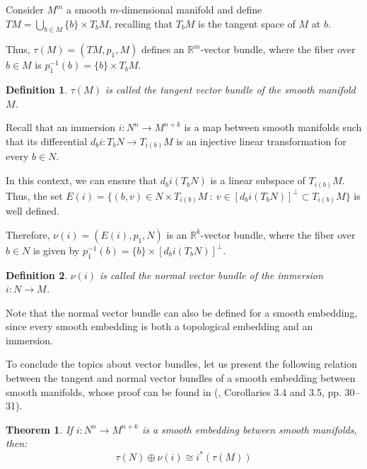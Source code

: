 \documentclass[12pt,oneside]{book}
\newtheorem{defi}   {Definition}[chapter]
\newtheorem{teo}    {Theorem}[chapter]
\newcommand{\ds}{\displaystyle}
\newcommand{\R}{\mathbb{R}}
\begin{document}
    Consider $M^{m}$ a smooth $m$-dimensional manifold and define $TM=\ds\bigcup_{b\in M}\{b\}\times T_{b}M$, recalling that $T_{b}M$ is the 
    tangent space of $M$ at $b$.
    
    Thus, $\tau(M)=(TM,p_{1},M)$ defines an $\R^{m}$-vector bundle, where the fiber over $b\in M$ is $p_{1}^{-1}(b)=\{b\}\times T_{b}M$.
    
    \begin{defi}\label{defi_fvt}
        $\tau(M)$ is called the tangent vector bundle of the smooth manifold $M$.
    \end{defi}
    
    Recall that an immersion $i:N^{n}\to M^{n+k}$ is a map between smooth manifolds such that its differential 
    $d_{b}i:T_{b}N\to T_{i(b)}M$ is an injective linear transformation for every $b\in N$.

    In this context, we can ensure that $d_{b}i(T_{b}N)$ is a linear subspace of $T_{i(b)}M$. Thus, the set 
    $E(i)=\{ (b,v)\in N\times T_{i(b)}M \ : \ v\in [d_{b}i(T_{b}N)]^{\perp}\subset T_{i(b)}M \}$ is well defined.
    
    Therefore, $\nu(i)=(E(i),p_{1},N)$ is an $\R^{k}$-vector bundle, where the fiber over $b\in N$ is given by 
    $p_{1}^{-1}(b)=\{b\}\times [d_{b}i(T_{b}N)]^{\perp}$.
    
    \begin{defi}\label{defi_fvn}
        $\nu(i)$ is called the normal vector bundle of the immersion $i:N\to M$.
    \end{defi}
    
    Note that the normal vector bundle can also be defined for a smooth embedding, since every smooth embedding is 
    both a topological embedding and an immersion.
    
    To conclude the topics about vector bundles, let us present the following relation between the tangent and normal vector bundles of a 
    smooth embedding between smooth manifolds, whose proof can be found in 
    (\cite{milnor_1}, Corollaries 3.4 and 3.5, pp. 30–31).
    
    \begin{teo}\label{dualidade_whitney_vet}
        If $i:N^{n}\to M^{n+k}$ is a smooth embedding between smooth manifolds, then:
        $$ \tau(N)\oplus\nu(i)\cong i^{*}(\tau(M)) $$
    \end{teo}
\end{document}
